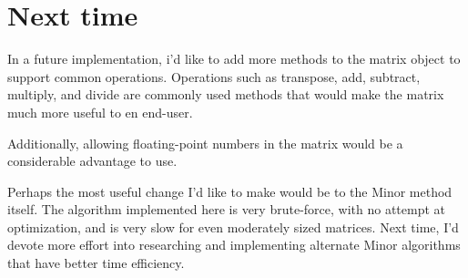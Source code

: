 \documentclass[a4paper,12pt]{article}
\begin{document}

\section{Next time}
In a future implementation, i'd like to add more methods to the matrix object to support common operations.  Operations such
as transpose, add, subtract, multiply, and divide are commonly used methods that would make the matrix much more useful
to en end-user.  

Additionally, allowing floating-point numbers in the matrix would be a considerable advantage to use.

Perhaps the most useful change I'd like to make would be to the Minor method itself.  The algorithm implemented here is 
very brute-force, with no attempt at optimization, and is very slow for even moderately sized matrices.  Next time, I'd devote 
more effort into researching and implementing alternate Minor algorithms that have better time efficiency.


\end{document}
